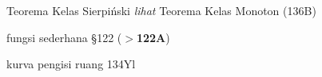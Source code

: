 Teorema Kelas Sierpi\'nski {\it lihat} Teorema Kelas Monoton (136B)














fungsi sederhana \S122 ({\bf $\pmb{>}$122A})













































































kurva pengisi ruang 134Yl




























